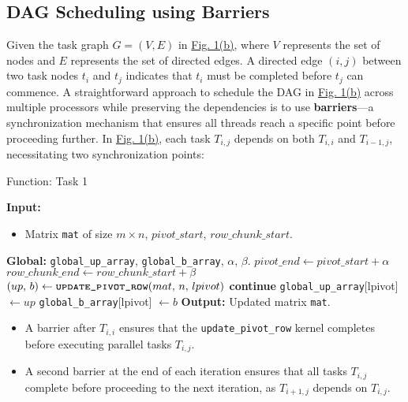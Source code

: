 \subsection{DAG Scheduling using Barriers}
Given the task graph $G = (V, E)$ in \hyperref[fig:task_graph]{Fig. 1(b)}, where $V$ represents the set of nodes and $E$ represents the set of directed edges.  A directed edge $(i, j)$ between two task nodes $t_i$ and $t_j$ indicates that $t_i$ must be completed before $t_j$ can commence. A straightforward approach to schedule the DAG in \hyperref[fig:task_graph]{Fig. 1(b)} across multiple processors while preserving the dependencies is to use \textbf{barriers}—a synchronization mechanism that ensures all threads reach a specific point before proceeding further.  In \hyperref[fig:task_graph]{Fig. 1(b)}, each task \(T_{i,j}\) depends on both \(T_{i,i}\) and \(T_{i-1,j}\), necessitating two synchronization points:  
\begin{algorithm}
	\caption{Function: Task 1}\label{alg:complete_task1}
	\begin{algorithmic}[1]
		\State \textbf{Input:} 
		\begin{itemize}
                \item Matrix \texttt{mat} of size $m\times n$, $pivot\_start$, $row\_chunk\_start$.
		\end{itemize}
		\State \textbf{Global:} \texttt{global\_up\_array}, \texttt{global\_b\_array}, \texttt{$\alpha$}, \texttt{$\beta$}.
		\State $pivot\_end \gets pivot\_start + \alpha $
		\State $row\_chunk\_end \gets row\_chunk\_start + \beta$
		\State $(up,\, b) \gets \Call{\texttt{update\_pivot\_row}}{mat,\, n,\, lpivot}$
		\State \textbf{continue}
		\EndIf
		\State \texttt{global\_up\_array}[lpivot] $\gets up$
		\State \texttt{global\_b\_array}[lpivot] $\gets b$
		\State {}
		\EndFor
		\EndFor
		\State \textbf{Output:} Updated matrix \texttt{mat}.
	\end{algorithmic}
\end{algorithm}

\begin{itemize}
    \item A barrier after \(T_{i,i}\) ensures that the \texttt{update\_pivot\_row} kernel completes before executing parallel tasks \(T_{i,j}\).  
    \item A second barrier at the end of each iteration ensures that all tasks \(T_{i,j}\) complete before proceeding to the next iteration, as \(T_{i+1,j}\) depends on \(T_{i,j}\).  
\end{itemize}  

